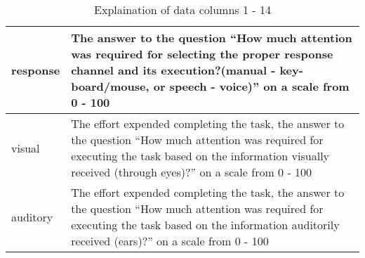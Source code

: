 \begin{table}[]
\begin{tabular}{|l|p{10cm}|}
response & The answer to the question ``How much attention was required for selecting the proper response channel and its execution?(manual - key- board/mouse, or speech - voice)'' on a scale from 0 - 100 \\ \hline
 visual & The effort expended completing the task, the answer to the question ``How much attention was required for executing the task based on the information visually received (through eyes)?'' on a scale from 0 - 100 \\ \hline
 auditory & The effort expended completing the task, the answer to the question ``How much attention was required for executing the task based on the information auditorily received (ears)?'' on a scale from 0 - 100 \\ \hline
\end{tabular}
\caption{Explaination of data columns 1 - 14}
\label{tab:my_label}
\end{table} 
 


